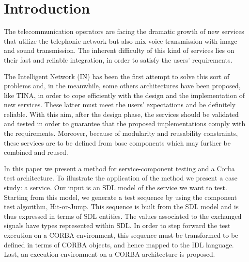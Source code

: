 
\section{Introduction}

The telecommunication operators are facing the dramatic growth of new
services that utilize the telephonic network but also mix voice
transmission with image and sound transmission. The inherent
difficulty of this kind of services lies on their fast and reliable
integration, in order to satisfy the users' requirements.

The Intelligent Network (IN) has been the first attempt to solve this
sort of problems and, in the meanwhile, some others architectures have
been proposed, like TINA, in order to cope efficiently with the design
and the implementation of new services. These latter must meet the
users' expectations and be definitely reliable. With this aim, after
the design phase, the services should be validated and tested in order
to guarantee that the proposed implementations comply with the
requirements. Moreover, because of modularity and reusability
constraints, these services are to be defined from base components
which may further be combined and reused.

In this paper we present a method for service-component testing and a
Corba test architecture. To illustrate the application of the method we
present a case study: a \audio service. 
Our input is an SDL
model of the service we want to test. Starting from this model, we
generate a test sequence by using the component test algorithm,
Hit-or-Jump. This sequence is built from the SDL model and is
thus expressed in terms of SDL entities. The values associated to
the exchanged signals have types represented within SDL. In order to
step forward the test execution on a CORBA environment, this sequence
must be transformed to be defined in terms of CORBA objects, and hence
mapped to the IDL language. Last, an execution environment on
a CORBA architecture is proposed.

